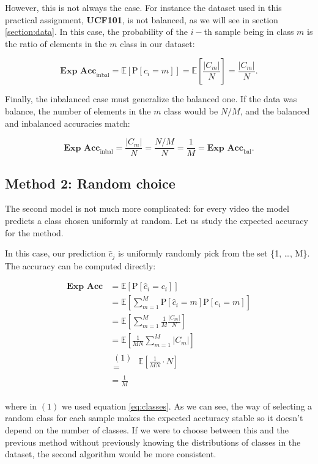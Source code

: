 \documentclass[letterpaper, 10 pt, conference]{ieeeconf}
\newcommand{\E}{\mathbb E}
\newcommand{\PP}{\text{P}}
\begin{document}
However, this is not always the case. For instance the dataset used in this practical assignment, \textbf{UCF101}, is not balanced, as we will see in section \ref{section:data}. In this case, the probability of the $i-$th sample being in class $m$ is the ratio of elements in the $m$ class in our dataset:

\[
    \textbf{Exp Acc}_\text{inbal} = \E \left[ \PP \left [ c_i = m \right ] \right ]  = \E \left[ \frac{|C_m|}{N} \right ] = \frac{|C_m|}{N}.
\]

Finally, the inbalanced case must generalize the balanced one. If the data was balance, the number of elements in the $m$ class would be $N/M$, and the balanced and inbalanced accuracies match:

\[
    \textbf{Exp Acc}_\text{inbal} = \frac{|C_m|}{N} = \frac{N/M}{N} = \frac{1}{M} = \textbf{Exp Acc}_\text{bal}.
\]

\subsection{Method 2: Random choice}

The second model is not much more complicated: for every video the model predicts a class chosen uniformly at random. Let us study the expected accuracy for the method.

In this case, our prediction $\hat c_j$ is uniformly randomly pick from the set \{1, \ldots, M\}. The accuracy can be computed directly:

\begin{align*}
    \textbf{Exp Acc} & = \E \left[ \PP \left [ \hat c_i = c_i \right ] \right ] \\
    & = \E \left[ \sum_{m=1}^M \PP \left[ \hat c_i = m \right] \PP \left[ c_i = m \right] \right] \\
    & = \E \left[ \sum_{m=1}^M \frac{1}{M} \frac{|C_m|}{N} \right] \\
    & = \E \left[ \frac{1}{MN} \sum_{m=1}^M |C_m| \right] \\
    & \substack{(1) \\ =} \; \E \left[ \frac{1}{MN} \cdot N \right] \\
    & = \frac{1}{M} \\
\end{align*}

where in $(1)$ we used equation \ref{eq:classes}. As we can see, the way of selecting a random class for each sample makes the expected accturacy stable so it doesn't depend on the number of classes. If we were to choose between this and the previous method without previously knowing the distributions of classes in the dataset, the second algorithm would be more consistent.
\end{document}
